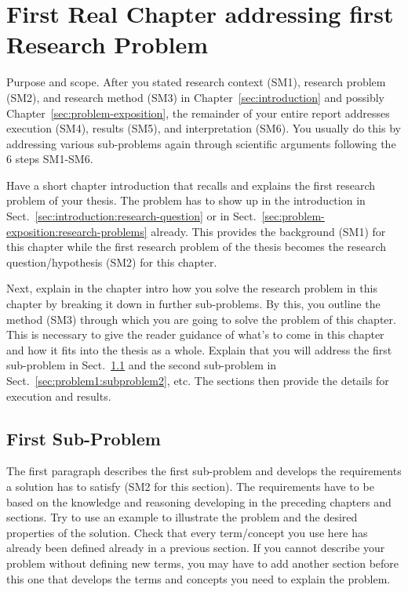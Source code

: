 \documentclass[12pt,a4paper,footinclude=true,twoside,headinclude=true]{report}
\begin{document}
\chapter{First Real Chapter addressing first Research Problem}\label{sec:problem1}

\textsf{Purpose and scope}. After you stated research context (SM1), research problem (SM2), and research method (SM3) in Chapter~\ref{sec:introduction} and possibly Chapter~\ref{sec:problem-exposition}, the remainder of your entire report addresses execution (SM4), results (SM5), and interpretation (SM6). You usually do this by addressing various sub-problems again through scientific arguments following the 6 steps SM1-SM6.

Have a short chapter introduction that recalls and explains the first research problem of your thesis. The problem has to show up in the introduction in Sect.~\ref{sec:introduction:research-question} or in Sect.~\ref{sec:problem-exposition:research-problems} already. This provides the background (SM1) for this chapter while the first research problem of the thesis becomes the research question/hypothesis (SM2) for this chapter. 

Next, explain in the chapter intro how you solve the research problem in this chapter by breaking it down in further sub-problems. By this, you outline the method (SM3) through which you are going to solve the problem of this chapter. This is necessary to give the reader guidance of what's to come in this chapter and how it fits into the thesis as a whole. Explain that you will address the first sub-problem in Sect.~\ref{sec:problem1:subproblem1} and the second sub-problem in Sect.~\ref{sec:problem1:subproblem2}, etc. The sections then provide the details for execution and results.

\section{First Sub-Problem}\label{sec:problem1:subproblem1}

\textsf{The first paragraph describes the first sub-problem and develops the requirements a solution has to satisfy (SM2 for this section).} The requirements have to be based on the knowledge and reasoning developing in the preceding chapters and sections. Try to use an example to illustrate the problem and the desired properties of the solution. Check that every term/concept you use here has already been defined already in a previous section. If you cannot describe your problem without defining new terms, you may have to add another section before this one that develops the terms and concepts you need to explain the problem.
\end{document}
